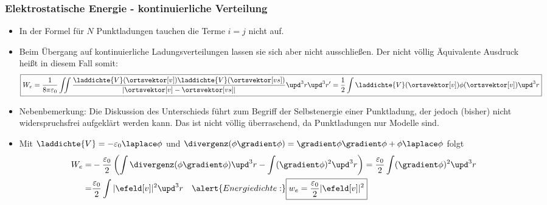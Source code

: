   \begin{frame}
    \frametitle{Elektrostatische Energie - kontinuierliche Verteilung}
    \begin{itemize}[<+->]
      \item In der Formel für $N$ Punktladungen tauchen die Terme
        $i=j$ nicht auf.
        \item Beim Übergang auf kontinuierliche Ladungsverteilungen
          lassen sie sich aber nicht ausschließen. Der \alert{nicht
            völlig Äquivalente} Ausdruck heißt in diesem Fall somit:
          $$
         \boxed{ W_e = \frac{1}{8\pi\varepsilon_0} \iint
    \frac{\laddichte{V}(\ortsvektor[v]) \laddichte{V}(\ortsvektor[vs])}{|\ortsvektor[v]-
      \ortsvektor[vs]|} \upd^3 r\upd^3 r' = \frac{1}{2} \int
    \laddichte{V}(\ortsvektor[v])\phi(\ortsvektor[v]) \upd^3 r}
  $$
  \item Nebenbemerkung: Die Diskussion des Unterschieds führt zum Begriff der
    \alert{Selbstenergie} einer Punktladung, der jedoch (bisher) nicht
    widerspruchsfrei aufgeklärt werden kann. Das ist nicht völlig
    überraschend, da Punktladungen nur Modelle sind.
    \item Mit $\laddichte{V}=-\varepsilon_0\laplace\phi$ und
      $\divergenz(\phi\gradient\phi) = \gradient\phi\gradient\phi + \phi\laplace\phi$
      folgt
      \begin{align*}
      W_e = & -\frac{\varepsilon_0}{2}\left(\int \divergenz(\phi\gradient\phi)
      \upd^3 r - \int (\gradient\phi)^2 \upd^3 r\right)  =
                     \frac{\varepsilon_0}{2} \int (\gradient\phi)^2 \upd^3 r\\
        = & \frac{\varepsilon_0}{2} \int |\efeld[v]|^2 \upd^3 r
            \quad\alert{Energiedichte:} \boxed{w_e = \frac{\varepsilon_0}{2} |\efeld[v]|^2}
      \end{align*}
    \end{itemize}
    \end{frame}

    
   
